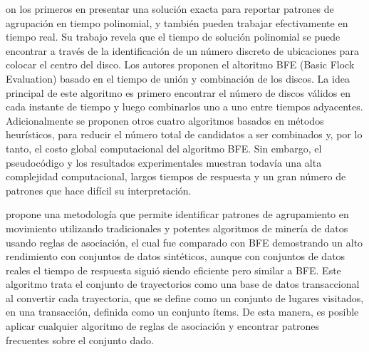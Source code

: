 \cite{vieira2009line} on  los  primeros  en  presentar  una  solución  exacta  para  reportar  patrones  de
agrupación en tiempo polinomial, y también pueden trabajar efectivamente en tiempo
real. Su trabajo revela que el tiempo de solución polinomial se puede encontrar a través
de  la  identificación  de  un  número  discreto  de  ubicaciones  para  colocar  el  centro  del
disco.  Los  autores  proponen  el  altoritmo  BFE  (Basic  Flock  Evaluation)  basado  en  el
tiempo de unión y combinación de los discos. La idea principal de este algoritmo es
primero  encontrar  el  número  de  discos  válidos  en  cada  instante  de  tiempo  y  luego
combinarlos  uno  a  uno  entre  tiempos  adyacentes. Adicionalmente  se  proponen  otros
cuatro  algoritmos  basados  en  métodos  heurísticos,  para  reducir  el  número  total  de
candidatos  a  ser  combinados  y,  por  lo  tanto,  el  costo  global  computacional  del
algoritmo  BFE.  Sin  embargo,  el pseudocódigo y  los  resultados  experimentales
muestran todavía una alta complejidad computacional, largos tiempos de respuesta y un
gran número de patrones que hace difícil su interpretación.


\cite{romero2011mining} propone  una  metodología  que  permite  identificar  patrones  de  agrupamiento  en
movimiento utilizando tradicionales y potentes algoritmos de minería de datos usando
reglas de asociación, el cual fue comparado con BFE demostrando un alto rendimiento
con conjuntos de datos sintéticos, aunque con conjuntos de datos reales el tiempo de
respuesta siguió siendo eficiente pero similar a BFE. Este algoritmo trata el conjunto de
trayectorios como una base de datos transaccional al convertir cada trayectoria, que se
define  como  un  conjunto  de  lugares  visitados,  en  una  transacción,  definida  como  un
conjunto  ítems.  De  esta  manera,  es  posible  aplicar  cualquier  algoritmo  de  reglas  de
asociación y encontrar patrones frecuentes sobre el conjunto dado.
